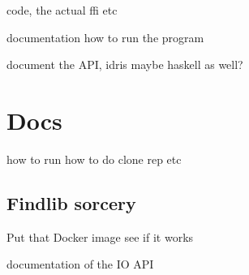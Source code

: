 
code, the actual ffi etc

documentation how to run the program

document the API, idris maybe haskell as well?

\section{Docs} 


how to run how to do clone rep etc

\subsection{Findlib sorcery}

Put that Docker image see if it works

documentation of the IO API